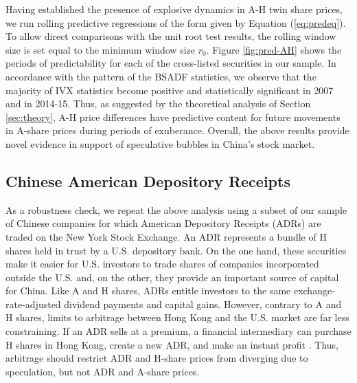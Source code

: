 \documentclass[11pt]{article}
\begin{document}


Having established the presence of explosive dynamics in A-H twin share prices, we run rolling predictive regressions of the form given by Equation (\ref{eq:predeq}). To allow direct comparisons with the unit root test results, the rolling window size is set equal to the minimum window size $r_0$. Figure \ref{fig:pred-AH} shows the periods of predictability for each of the cross-listed securities in our sample. In accordance with the pattern of the BSADF statistics, we observe that the majority of IVX statistics become positive and statistically significant in 2007 and in 2014-15. Thus, as suggested by the theoretical analysis of Section \ref{sec:theory}, A-H price differences have predictive content for future movements in A-share prices during periods of exuberance. Overall, the above results provide novel evidence in support of speculative bubbles in China's stock market. 

\subsection{Chinese American Depository Receipts}

As a robustness check, we repeat the above analysis using a subset of our sample of Chinese companies for which American Depository Receipts (ADRs) are traded on the New York Stock Exchange. An ADR represents a bundle of H shares held in trust by a U.S. depository bank. On the one hand, these securities make it easier for U.S. investors to trade shares of companies incorporated outside the U.S. and, on the other, they provide an important source of capital for China. Like A and H shares, ADRs entitle investors to the same exchange-rate-adjusted dividend payments and capital gains. However, contrary to A and H shares, limits to arbitrage between Hong Kong and the U.S. market are far less constraining. If an ADR sells at a premium, a financial intermediary can purchase H shares in Hong Kong, create a new ADR, and make an instant profit \citep{LamontT2003}. Thus, arbitrage should restrict ADR and H-share prices from diverging due to speculation, but not ADR and A-share prices. 
\end{document}
